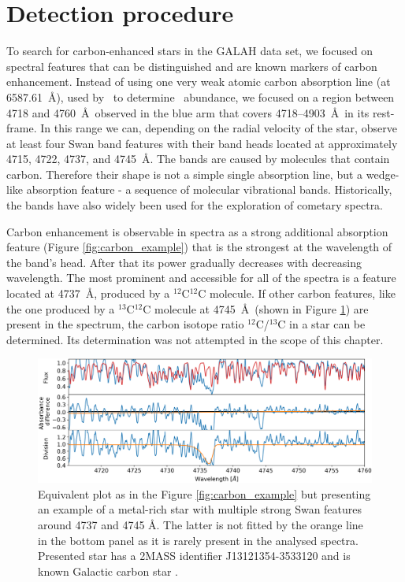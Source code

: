 \section{Detection procedure}
\label{sec:classification_cemp}
To search for carbon-enhanced stars in the GALAH data set, we focused on spectral features that can be distinguished and are known markers of carbon enhancement. Instead of using one very weak atomic carbon absorption line (at 6587.61~\AA), used by \TC\ to determine \Cfe\ abundance, we focused on a region between 4718 and 4760~\AA\ observed in the blue arm that covers 4718--4903~\AA\ in its rest-frame. In this range we can, depending on the radial velocity of the star, observe at least four Swan band features \cite{1927RSPTA.226..157J} with their band heads located at approximately 4715, 4722, 4737, and 4745~\AA. The bands are caused by molecules that contain carbon. Therefore their shape is not a simple single absorption line, but a wedge-like absorption feature - a sequence of molecular vibrational bands. Historically, the bands have also widely been used for the exploration of cometary spectra.

Carbon enhancement is observable in spectra as a strong additional absorption feature (Figure \ref{fig:carbon_example}) that is the strongest at the wavelength of the band's head. After that its power gradually decreases with decreasing wavelength. The most prominent and accessible for all of the spectra is a feature located at 4737~\AA, produced by a $^{12}$C$^{12}$C molecule. If other carbon features, like the one produced by a $^{13}$C$^{12}$C molecule at 4745~\AA\ (shown in Figure \ref{fig:carbon_example2}) are present in the spectrum, the carbon isotope ratio $^{12}$C/$^{13}$C in a star can be determined. Its determination was not attempted in the scope of this chapter.

\begin{figure}
	\centering
	\includegraphics[width=\textwidth]{rich_160515003401143.png}
	\caption{Equivalent plot as in the Figure \ref{fig:carbon_example} but presenting an example of a metal-rich star with multiple strong Swan features around 4737 and 4745 \AA. The latter is not fitted by the orange line in the bottom panel as it is rarely present in the analysed spectra. Presented star has a 2MASS identifier J13121354-3533120 and is known Galactic carbon star \cite{2001BaltA..10....1A}.}
	\label{fig:carbon_example2}
\end{figure}

